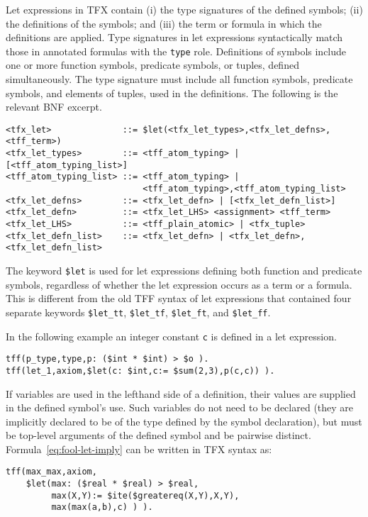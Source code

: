 \documentclass{easychair}
\begin{document}
Let expressions in TFX contain (i) the type signatures of the defined 
symbols; (ii) the definitions of the symbols; and (iii) the term or formula
in which the definitions are applied. 
Type signatures in let expressions syntactically match those in annotated 
formulas with the \verb'type' role. 
Definitions of symbols include one or more function symbols, predicate symbols,
or tuples, defined simultaneously. 
The type signature must include all function symbols, predicate symbols, and 
elements of tuples, used in the definitions. 
The following is the relevant BNF excerpt.
\begin{verbatim}
<tfx_let>              ::= $let(<tfx_let_types>,<tfx_let_defns>,<tff_term>)
<tfx_let_types>        ::= <tff_atom_typing> | [<tff_atom_typing_list>]
<tff_atom_typing_list> ::= <tff_atom_typing> |
                           <tff_atom_typing>,<tff_atom_typing_list>
<tfx_let_defns>        ::= <tfx_let_defn> | [<tfx_let_defn_list>]
<tfx_let_defn>         ::= <tfx_let_LHS> <assignment> <tff_term>
<tfx_let_LHS>          ::= <tff_plain_atomic> | <tfx_tuple>
<tfx_let_defn_list>    ::= <tfx_let_defn> | <tfx_let_defn>,<tfx_let_defn_list>
\end{verbatim}
The keyword \verb'$let' is used for let expressions defining both function and 
predicate symbols, regardless of whether the let expression occurs as a term 
or a formula. 
This is different from the old TFF syntax of let expressions that contained 
four separate keywords \verb'$let_tt', \verb'$let_tf', \verb'$let_ft', and 
\verb'$let_ff'.

In the following example an integer constant {\tt c} is defined in a let expression.
\begin{verbatim}
tff(p_type,type,p: ($int * $int) > $o ).
tff(let_1,axiom,$let(c: $int,c:= $sum(2,3),p(c,c)) ).
\end{verbatim}

If variables are used in the lefthand side of a definition, their values are 
supplied in the defined symbol's use. 
Such variables do not need to be declared (they are implicitly declared to be 
of the type defined by the symbol declaration), but must be top-level arguments 
of the defined symbol and be pairwise distinct. 
Formula~\ref{eq:fool-let-imply} can be written in TFX syntax as:
\begin{verbatim}
tff(max_max,axiom,
    $let(max: ($real * $real) > $real,
         max(X,Y):= $ite($greatereq(X,Y),X,Y),
         max(max(a,b),c) ) ).
\end{verbatim}
\end{document}
